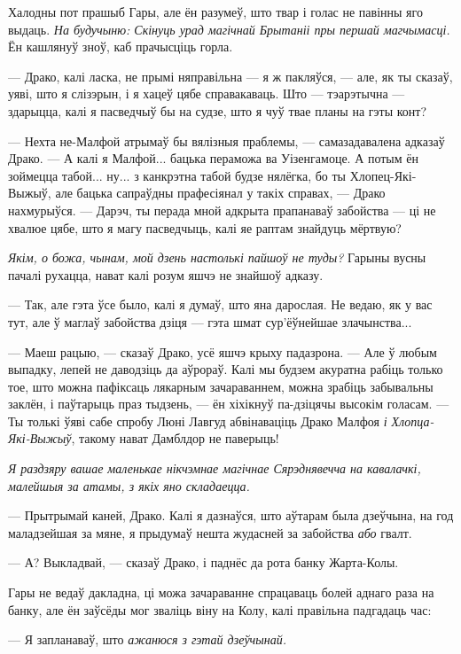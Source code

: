 Халодны пот прашыб Гары, але ён разумеў, што твар і голас не павінны яго выдаць.
\emph{На будучыню: Скінуць урад магічнай Брытаніі пры першай магчымасці.} Ён 
кашлянуў зноў, каб прачысціць горла. 

--- Драко, калі ласка, не прымі няправільна --- я ж пакляўся, --- але, як ты сказаў,
уяві, што я слізэрын, і я хацеў цябе справакаваць. Што --- тэарэтычна --- здарыцца, 
калі я пасведчыў бы на судзе, што я чуў твае планы на гэты конт?

--- Нехта не-Малфой атрымаў бы вялізныя праблемы, --- самазадавалена адказаў Драко.
--- А калі я Малфой... бацька пераможа ва Уізенгамоце. А потым ён зоймецца табой...
ну... з канкрэтна табой будзе нялёгка, бо ты Хлопец-Які-Выжыў, але бацька сапраўдны 
прафесіянал у такіх справах, --- Драко нахмурыўся. --- Дарэч, ты перада мной адкрыта 
прапанаваў забойства --- ці не хвалюе цябе, што я магу пасведчыць, калі яе
раптам знайдуць мёртвую?

\emph{Якім, о божа, чынам, 
мой дзень настолькі пайшоў не туды?} Гарыны вусны пачалі рухацца, нават калі 
розум яшчэ не знайшоў адказу.

--- Так, але гэта ўсе было, калі я думаў, што яна дарослая. 
Не ведаю, як у вас тут, але ў маглаў забойства дзіця --- гэта 
шмат сур'ёўнейшае злачынства...


--- Маеш рацыю, --- сказаў Драко, усё яшчэ крыху падазрона. ---
Але ў любым выпадку, лепей не даводзіць да аўрораў.
Калі мы будзем акуратна рабіць только тое, што можна пафіксаць 
лякарным зачараваннем, можна зрабіць забывальны заклён, і паўтарыць
праз тыдзень, --- ён хіхікнуў па-дзіцячы высокім голасам. ---
Ты толькі ўяві сабе спробу Люні Лавгуд абвінаваціць Драко Малфоя \emph{і Хлопца-Які-Выжыў},
такому нават Дамблдор не паверыць!

\emph{Я раздзяру вашае маленькае нікчэмнае магічнае Сярэднявечча на кавалачкі,
малейшыя за атамы, з якіх яно складаецца.}


--- Прытрымай каней, Драко. Калі я дазнаўся, што аўтарам была дзеўчына, на год 
маладзейшая за мяне, я прыдумаў нешта жудасней за забойства \emph{або} гвалт.

--- А? Выкладвай, --- сказаў Драко, і паднёс да рота банку Жарта-Колы.

Гары не ведаў дакладна, ці можа зачараванне спрацаваць болей аднаго раза на банку,
але ён заўсёды мог зваліць віну на Колу, калі правільна падгадаць час:

--- Я запланаваў, што \emph{ажанюся з гэтай дзеўчынай.}


